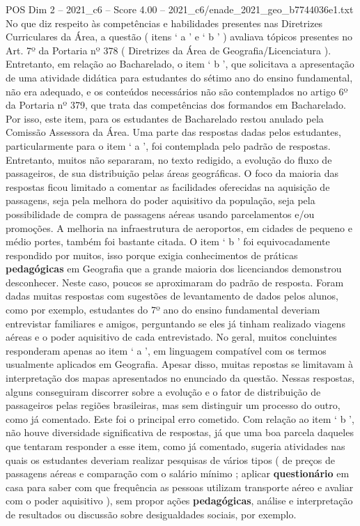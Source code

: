 \begin{textsample}{POS Dim 2 – 2021\_c6 – Score 4.00 – 2021\_c6/enade\_2021\_geo\_b7744036e1.txt}
No que diz respeito às competências e habilidades presentes nas Diretrizes Curriculares da Área, a questão ( itens ‘ a ’ e ‘ b ’ ) avaliava tópicos presentes no Art. 7º da Portaria nº 378 ( Diretrizes da Área de Geografia/Licenciatura ).
Entretanto, em relação ao Bacharelado, o item ‘ b ’, que solicitava a apresentação de uma atividade didática para estudantes do sétimo ano do ensino fundamental, não era adequado, e os conteúdos necessários não são contemplados no artigo 6º da Portaria nº 379, que trata das competências dos formandos em Bacharelado.
Por isso, este item, para os estudantes de Bacharelado restou anulado pela Comissão Assessora da Área.
Uma parte das respostas dadas pelos estudantes, particularmente para o item ‘ a ’, foi contemplada pelo padrão de respostas.
Entretanto, muitos não separaram, no texto redigido, a evolução do fluxo de passageiros, de sua distribuição pelas áreas geográficas.
O foco da maioria das respostas ficou limitado a comentar as facilidades oferecidas na aquisição de passagens, seja pela melhora do poder aquisitivo da população, seja pela possibilidade de compra de passagens aéreas usando parcelamentos e/ou promoções.
A melhoria na infraestrutura de aeroportos, em cidades de pequeno e médio portes, também foi bastante citada.
O item ‘ b ’ foi equivocadamente respondido por muitos, isso porque exigia conhecimentos de práticas \textbf{pedagógicas} em Geografia que a grande maioria dos licenciandos demonstrou desconhecer.
Neste caso, poucos se aproximaram do padrão de resposta.
Foram dadas muitas respostas com sugestões de levantamento de dados pelos alunos, como por exemplo, estudantes do 7º ano do ensino fundamental deveriam entrevistar familiares e amigos, perguntando se eles já tinham realizado viagens aéreas e o poder aquisitivo de cada entrevistado.
No geral, muitos concluintes responderam apenas ao item ‘ a ’, em linguagem compatível com os termos usualmente aplicados em Geografia.
Apesar disso, muitas repostas se limitavam à interpretação dos mapas apresentados no enunciado da questão.
Nessas respostas, alguns conseguiram discorrer sobre a evolução e o fator de distribuição de passageiros pelas regiões brasileiras, mas sem distinguir um processo do outro, como já comentado.
Este foi o principal erro cometido.
Com relação ao item ‘ b ’, não houve diversidade significativa de respostas, já que uma boa parcela daqueles que tentaram responder a esse item, como já comentado, sugeria atividades nas quais os estudantes deveriam realizar pesquisas de vários tipos ( de preços de passagens aéreas e comparação com o salário mínimo ; aplicar \textbf{questionário} em casa para saber com que frequência as pessoas utilizam transporte aéreo e avaliar com o poder aquisitivo ), sem propor ações \textbf{pedagógicas}, análise e interpretação de resultados ou discussão sobre desigualdades sociais, por exemplo.

\end{textsample}
